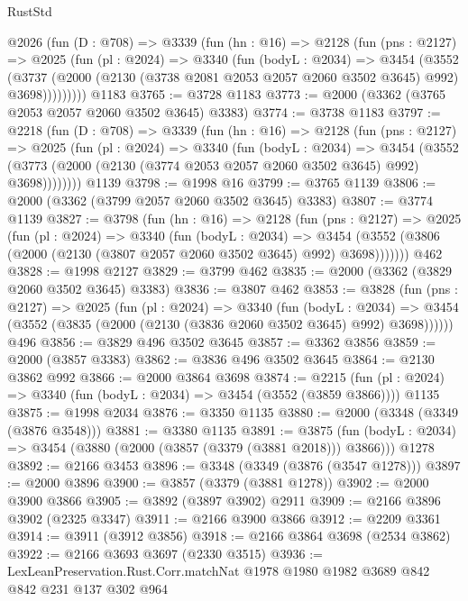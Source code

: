 \begin{lexlean}{RustStd}
\begin{coremodule}
    @2026
      (fun (D : @708) =>
      @3339
        (fun (hn : @16) =>
        @2128
          (fun (pns : @2127) =>
          @2025
            (fun (pl : @2024) =>
            @3340
              (fun (bodyL : @2034) =>
              @3454
                (@3552
                  (@3737
                    (@2000 (@2130 (@3738 @2081 @2053 @2057 @2060 @3502 @3645) @992) @3698)))))))))
    @1183
@3765 := @3728 @1183
@3773 := @2000 (@3362 (@3765 @2053 @2057 @2060 @3502 @3645) @3383)
@3774 := @3738 @1183
@3797 := @2218
    (fun (D : @708) =>
    @3339
      (fun (hn : @16) =>
      @2128
        (fun (pns : @2127) =>
        @2025
          (fun (pl : @2024) =>
          @3340
            (fun (bodyL : @2034) =>
            @3454
              (@3552 (@3773 (@2000 (@2130 (@3774 @2053 @2057 @2060 @3502 @3645) @992) @3698))))))))
    @1139
@3798 := @1998 @16
@3799 := @3765 @1139
@3806 := @2000 (@3362 (@3799 @2057 @2060 @3502 @3645) @3383)
@3807 := @3774 @1139
@3827 := @3798
    (fun (hn : @16) =>
    @2128
      (fun (pns : @2127) =>
      @2025
        (fun (pl : @2024) =>
        @3340
          (fun (bodyL : @2034) =>
          @3454 (@3552 (@3806 (@2000 (@2130 (@3807 @2057 @2060 @3502 @3645) @992) @3698)))))))
    @462
@3828 := @1998 @2127
@3829 := @3799 @462
@3835 := @2000 (@3362 (@3829 @2060 @3502 @3645) @3383)
@3836 := @3807 @462
@3853 := @3828
    (fun (pns : @2127) =>
    @2025
      (fun (pl : @2024) =>
      @3340
        (fun (bodyL : @2034) =>
        @3454 (@3552 (@3835 (@2000 (@2130 (@3836 @2060 @3502 @3645) @992) @3698))))))
    @496
@3856 := @3829 @496 @3502 @3645
@3857 := @3362 @3856
@3859 := @2000 (@3857 @3383)
@3862 := @3836 @496 @3502 @3645
@3864 := @2130 @3862 @992
@3866 := @2000 @3864 @3698
@3874 := @2215
    (fun (pl : @2024) => @3340 (fun (bodyL : @2034) => @3454 (@3552 (@3859 @3866))))
    @1135
@3875 := @1998 @2034
@3876 := @3350 @1135
@3880 := @2000 (@3348 (@3349 (@3876 @3548)))
@3881 := @3380 @1135
@3891 := @3875
    (fun (bodyL : @2034) => @3454 (@3880 (@2000 (@3857 (@3379 (@3881 @2018))) @3866)))
    @1278
@3892 := @2166 @3453
@3896 := @3348 (@3349 (@3876 (@3547 @1278)))
@3897 := @2000 @3896
@3900 := @3857 (@3379 (@3881 @1278))
@3902 := @2000 @3900 @3866
@3905 := @3892 (@3897 @3902) @2911
@3909 := @2166 @3896 @3902 (@2325 @3347)
@3911 := @2166 @3900 @3866
@3912 := @2209 @3361
@3914 := @3911 (@3912 @3856)
@3918 := @2166 @3864 @3698 (@2534 @3862)
@3922 := @2166 @3693 @3697 (@2330 @3515)
@3936 := LexLeanPreservation.Rust.Corr.matchNat
    @1978
    @1980
    @1982
    @3689
    @842
    @842
    @231
    @137
    @302
    @964

\end{coremodule}
\end{lexlean}
